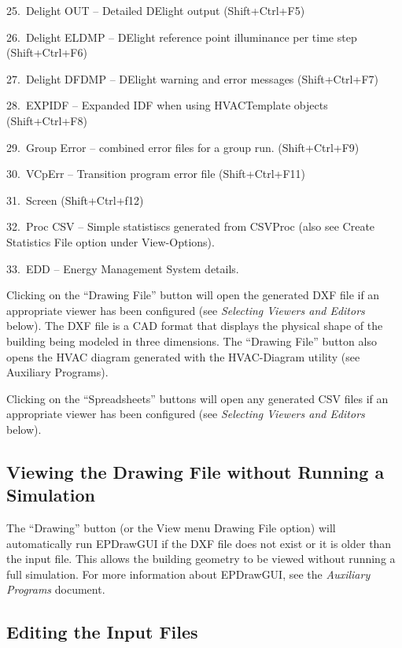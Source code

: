 25.~Delight OUT -- Detailed DElight output (Shift+Ctrl+F5)

26.~Delight ELDMP -- DElight reference point illuminance per time step (Shift+Ctrl+F6)

27.~Delight DFDMP -- DElight warning and error messages (Shift+Ctrl+F7)

28.~EXPIDF -- Expanded IDF when using HVACTemplate objects (Shift+Ctrl+F8)

29.~Group Error -- combined error files for a group run. (Shift+Ctrl+F9)

30.~VCpErr -- Transition program error file (Shift+Ctrl+F11)

31.~Screen (Shift+Ctrl+f12)

32.~Proc CSV -- Simple statistiscs generated from CSVProc (also see Create Statistics File option under View-Options).

33.~EDD -- Energy Management System details.

Clicking on the ``Drawing File'' button will open the generated DXF file if an appropriate viewer has been configured (see \emph{Selecting Viewers and Editors} below). The DXF file is a CAD format that displays the physical shape of the building being modeled in three dimensions. The ``Drawing File'' button also opens the HVAC diagram generated with the HVAC-Diagram utility (see Auxiliary Programs).

Clicking on the ``Spreadsheets'' buttons will open any generated CSV files if an appropriate viewer has been configured (see \emph{Selecting Viewers and Editors} below).

\subsection{Viewing the Drawing File without Running a Simulation}\label{viewing-the-drawing-file-without-running-a-simulation}

The ``Drawing'' button (or the View menu Drawing File option) will automatically run EPDrawGUI if the DXF file does not exist or it is older than the input file. This allows the building geometry to be viewed without running a full simulation. For more information about EPDrawGUI, see the \emph{Auxiliary Programs} document.

\subsection{Editing the Input Files}\label{editing-the-input-files}

